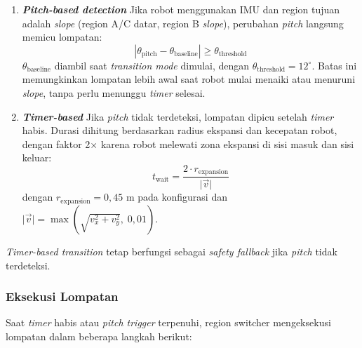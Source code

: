 \begin{enumerate}
  \item \textbf{\emph{Pitch-based detection}} \newline
  Jika robot menggunakan
  IMU dan region tujuan adalah \emph{slope} (region A/C datar, region B
  \emph{slope}), perubahan \emph{pitch} langsung memicu lompatan:
  \begin{equation}
  |\theta_{\text{pitch}} - \theta_{\text{baseline}}| \geq \theta_{\text{threshold}}
  \end{equation}
  $\theta_{\text{baseline}}$ diambil saat \emph{transition mode} dimulai,
  dengan $\theta_{\text{threshold}} = 12^\circ$. Batas ini memungkinkan
  lompatan lebih awal saat robot mulai menaiki atau menuruni \emph{slope},
  tanpa perlu menunggu \emph{timer} selesai.

  \item \textbf{\emph{Timer-based}} \newline
  Jika \emph{pitch} tidak
  terdeteksi, lompatan dipicu setelah
  \emph{timer} habis. Durasi dihitung berdasarkan radius ekspansi dan
  kecepatan robot, dengan faktor 2$\times$ karena robot melewati zona
  ekspansi di sisi masuk dan sisi keluar:
  \begin{equation}
  t_{\text{wait}} = \frac{2 \cdot r_{\text{expansion}}}{\lvert\vec{v}\rvert}
  \end{equation}
  dengan $r_{\text{expansion}} = 0{,}45$ m pada konfigurasi dan
  $\lvert\vec{v}\rvert = \max(\sqrt{v_x^2 + v_y^2},\; 0{,}01)$.
\end{enumerate}

\emph{Timer-based transition} tetap berfungsi sebagai \emph{safety fallback}
jika \emph{pitch} tidak terdeteksi.

\subsubsection{Eksekusi Lompatan}

Saat \emph{timer} habis atau \emph{pitch trigger} terpenuhi, region
switcher mengeksekusi lompatan dalam beberapa langkah berikut:

